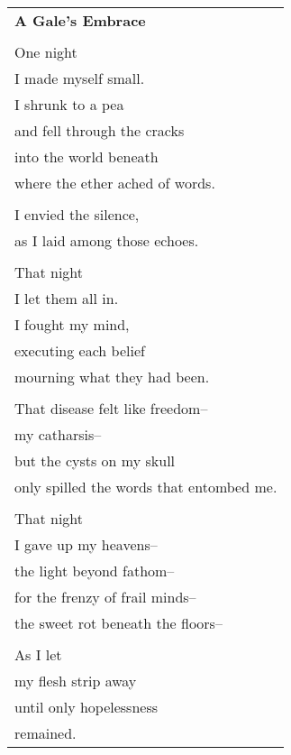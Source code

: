 \documentclass{article}
\begin{document}
\begin{center}
\begin{tabular}{l}
\textbf{A Gale's Embrace} \\
\\
One night \\
I made myself small. \\
I shrunk to a pea \\
and fell through the cracks \\
into the world beneath \\
where the ether ached of words. \\
\\
I envied the silence, \\
as I laid among those echoes. \\
\\
That night \\
I let them all in. \\
I fought my mind, \\
executing each belief \\
mourning what they had been. \\
\\
That disease felt like freedom-- \\
my catharsis-- \\
but the cysts on my skull \\
only spilled the words that entombed me. \\ %
\\
That night \\
I gave up my heavens-- \\
the light beyond fathom-- \\
for the frenzy of frail minds-- \\
the sweet rot beneath the floors-- \\
\\
As I let \\
my flesh strip away \\
until only hopelessness \\
remained. \\
\end{tabular}
\end{center}
\end{document}
